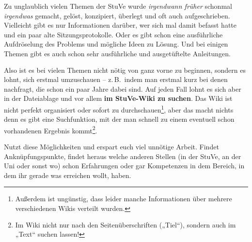 


%
%
%


\null
\clearpage


\null
\vfill
Zu unglaublich vielen Themen der StuVe wurde \textit{irgendwann früher}{\textsuperscript\texttrademark} schonmal \textit{irgendwas}{\textsuperscript\textcopyright} gemacht, gelöst, konzipiert, überlegt und oft auch aufgeschrieben. Vielleicht gibt es nur Informationen darüber, wer sich mal damit befasst hatte und ein paar alte Sitzungsprotokolle. Oder es gibt schon eine ausführliche Aufdröselung des Problems und mögliche Ideen zu Lösung. Und bei einigen Themen gibt es auch schon sehr ausführliche und ausgetüftelte Anleitungen.

Also ist es bei vielen Themen nicht nötig von ganz vorne zu beginnen, sondern es lohnt, sich erstmal umzuschauen -- z.\,B.~indem man erstmal kurz bei denen nachfragt, die schon ein paar Jahre dabei sind. Auf jeden Fall lohnt es sich aber in der Dateiablage und vor allem \textbf{im StuVe-Wiki zu suchen}. Das Wiki ist nicht perfekt organisiert oder sofort zu durchschauen\footnote{Außerdem ist ungünstig, dass leider manche Informationen über mehrere verschiedenen Wikis verteilt wurden.}, aber das macht nichts denn es gibt eine Suchfunktion, mit der man schnell zu einem eventuell schon vorhandenen Ergebnis kommt\footnote{Im Wiki nicht nur nach den Seitenüberschriften („Tiel“), sondern auch im „Text“ suchen lassen!}.

Nutzt diese Möglichkeiten und erspart euch viel unnötige Arbeit. Findet Anknüpfungspunkte, findet heraus welche anderen Stellen (in der StuVe, an der Uni oder sonst wo) schon Erfahrungen oder gar Kompetenzen in dem Bereich, in dem ihr gerade was erreichen wollt, haben.
\vfill
\vfill
